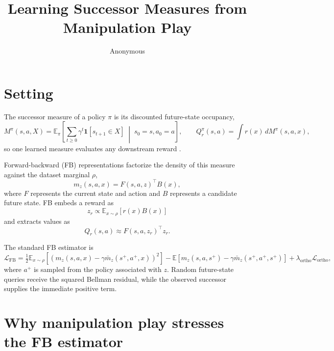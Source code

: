 \documentclass{article}
\title{Learning Successor Measures from Manipulation Play}
\author{Anonymous}
\newcommand{\E}{\mathbb{E}}
\newcommand{\ind}[1]{\mathbf{1}\!\left[#1\right]}
\begin{document}
\maketitle

\section{Setting}
\label{sec:prelim}

The successor measure of a policy $\pi$ is its discounted future-state occupancy,
\begin{equation}
\label{eq:sm}
M^\pi(s,a,X) = \E_\pi\!\left[ \sum_{t\ge0}\gamma^t \ind{s_{t+1}\in X} \;\middle|\; s_0=s,a_0=a \right], \qquad Q_r^\pi(s,a) = \int r(x)\,dM^\pi(s,a,x),
\end{equation}
so one learned measure evaluates any downstream reward
\citep{dayan1993improving,blier2021learning}.

Forward-backward (FB) representations
\citep{touati2021learning,touati2023does}
factorize the density of this measure against the dataset marginal $\rho$,
\begin{equation}
m_z(s,a,x) = F(s,a,z)^\top B(x),
\end{equation}
where $F$ represents the current state and action and $B$ represents a candidate future state.
FB embeds a reward as
\begin{equation}
z_r \propto \E_{x\sim\rho}[r(x)B(x)]
\end{equation}
and extracts values as
\begin{equation}
Q_r(s,a) \approx F(s,a,z_r)^\top z_r.
\end{equation}

The standard FB estimator is
\begin{equation}
\label{eq:fb-loss}
\mathcal L_{\mathrm{FB}} = \tfrac12 \E_{x\sim\rho} \left[ \left( m_z(s,a,x) - \gamma\bar m_z(s^+,a^+,x) \right)^2 \right]
                            - \E\left[ m_z(s,a,s^+) - \gamma\bar m_z(s^+,a^+,s^+) \right]
                            + \lambda_{\mathrm{ortho}} \mathcal L_{\mathrm{ortho}},
\end{equation}
where $a^+$ is sampled from the policy associated with $z$.
Random future-state queries receive the squared Bellman residual, while the observed successor supplies the immediate positive term.

\section{Why manipulation play stresses the FB estimator}
\label{sec:play}
\end{document}
